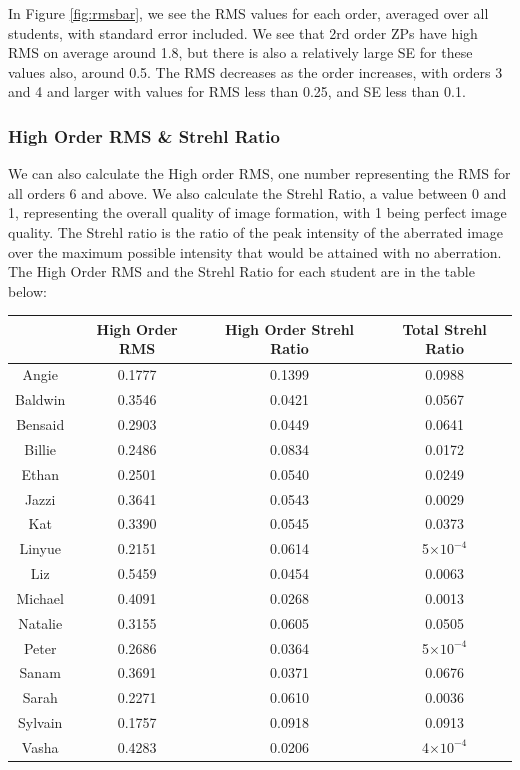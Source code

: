 \documentclass{article}
\begin{document}
In Figure \ref{fig:rmsbar}, we see the RMS values for each order, averaged over all students, with standard error included. We see that 2rd order ZPs have high RMS on average around 1.8, but there is also a relatively large SE for these values also, around 0.5. The RMS decreases as the order increases, with orders 3 and 4 and larger with values for RMS less than 0.25, and SE less than 0.1. \

\subsubsection{High Order RMS \& Strehl Ratio}

We can also calculate the High order RMS, one number representing the RMS for all orders 6 and above. We also calculate the Strehl Ratio, a value between 0 and 1, representing the overall quality of image formation, with 1 being perfect image quality. The Strehl ratio is the ratio of the peak intensity of the aberrated image over the maximum possible intensity that would be attained with no aberration. The High Order RMS and the Strehl Ratio for each student are in the table below:

\begin{table}[H]
    \centering
    \begin{tabular}{cccc}
          & High Order RMS & High Order Strehl Ratio & Total Strehl Ratio \\ \hline
        Angie & 0.1777 & 0.1399 & 0.0988 \\
        Baldwin & 0.3546 & 0.0421 & 0.0567 \\
        Bensaid & 0.2903 & 0.0449 & 0.0641 \\
        Billie & 0.2486 & 0.0834 & 0.0172 \\
        Ethan & 0.2501 & 0.0540 & 0.0249 \\
        Jazzi & 0.3641 & 0.0543 & 0.0029 \\
        Kat & 0.3390 & 0.0545 & 0.0373 \\
        Linyue & 0.2151 & 0.0614 & 5$\times10^{-4}$ \\
        Liz & 0.5459 & 0.0454 & 0.0063 \\
        Michael & 0.4091 & 0.0268 & 0.0013 \\
        Natalie & 0.3155 & 0.0605 & 0.0505 \\
        Peter & 0.2686 & 0.0364 & 5$\times10^{-4}$ \\
        Sanam & 0.3691 & 0.0371 & 0.0676 \\
        Sarah & 0.2271 & 0.0610 & 0.0036 \\
        Sylvain & 0.1757 & 0.0918 & 0.0913 \\
        Vasha & 0.4283 & 0.0206 & 4$\times10^{-4}$ \\
    \end{tabular}
\end{table}
\end{document}

